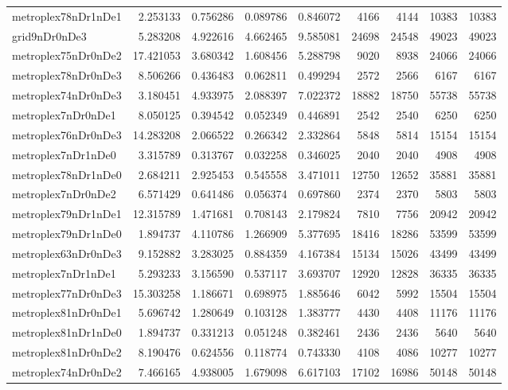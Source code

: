 \begin{longtable}{|l|r|r|r|r|r|r|r|r|}
metroplex78nDr1nDe1 & 2.253133 & 0.756286 & 0.089786 & 0.846072 & 4166 & 4144 & 10383 & 10383 \\
grid9nDr0nDe3 & 5.283208 & 4.922616 & 4.662465 & 9.585081 & 24698 & 24548 & 49023 & 49023 \\
metroplex75nDr0nDe2 & 17.421053 & 3.680342 & 1.608456 & 5.288798 & 9020 & 8938 & 24066 & 24066 \\
metroplex78nDr0nDe3 & 8.506266 & 0.436483 & 0.062811 & 0.499294 & 2572 & 2566 & 6167 & 6167 \\
metroplex74nDr0nDe3 & 3.180451 & 4.933975 & 2.088397 & 7.022372 & 18882 & 18750 & 55738 & 55738 \\
metroplex7nDr0nDe1 & 8.050125 & 0.394542 & 0.052349 & 0.446891 & 2542 & 2540 & 6250 & 6250 \\
metroplex76nDr0nDe3 & 14.283208 & 2.066522 & 0.266342 & 2.332864 & 5848 & 5814 & 15154 & 15154 \\
metroplex7nDr1nDe0 & 3.315789 & 0.313767 & 0.032258 & 0.346025 & 2040 & 2040 & 4908 & 4908 \\
metroplex78nDr1nDe0 & 2.684211 & 2.925453 & 0.545558 & 3.471011 & 12750 & 12652 & 35881 & 35881 \\
metroplex7nDr0nDe2 & 6.571429 & 0.641486 & 0.056374 & 0.697860 & 2374 & 2370 & 5803 & 5803 \\
metroplex79nDr1nDe1 & 12.315789 & 1.471681 & 0.708143 & 2.179824 & 7810 & 7756 & 20942 & 20942 \\
metroplex79nDr1nDe0 & 1.894737 & 4.110786 & 1.266909 & 5.377695 & 18416 & 18286 & 53599 & 53599 \\
metroplex63nDr0nDe3 & 9.152882 & 3.283025 & 0.884359 & 4.167384 & 15134 & 15026 & 43499 & 43499 \\
metroplex7nDr1nDe1 & 5.293233 & 3.156590 & 0.537117 & 3.693707 & 12920 & 12828 & 36335 & 36335 \\
metroplex77nDr0nDe3 & 15.303258 & 1.186671 & 0.698975 & 1.885646 & 6042 & 5992 & 15504 & 15504 \\
metroplex81nDr0nDe1 & 5.696742 & 1.280649 & 0.103128 & 1.383777 & 4430 & 4408 & 11176 & 11176 \\
metroplex81nDr1nDe0 & 1.894737 & 0.331213 & 0.051248 & 0.382461 & 2436 & 2436 & 5640 & 5640 \\
metroplex81nDr0nDe2 & 8.190476 & 0.624556 & 0.118774 & 0.743330 & 4108 & 4086 & 10277 & 10277 \\
metroplex74nDr0nDe2 & 7.466165 & 4.938005 & 1.679098 & 6.617103 & 17102 & 16986 & 50148 & 50148 \\

\end{longtable}
